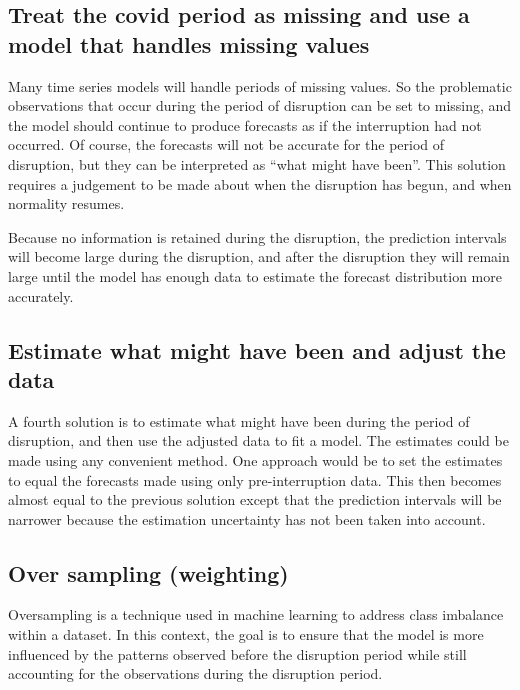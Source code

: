 \documentclass[11pt,a4paper,]{article}
\begin{document}
\subsection{Treat the covid period as missing and use a model that
handles missing
values}\label{treat-the-covid-period-as-missing-and-use-a-model-that-handles-missing-values}

Many time series models will handle periods of missing values. So the
problematic observations that occur during the period of disruption can
be set to missing, and the model should continue to produce forecasts as
if the interruption had not occurred. Of course, the forecasts will not
be accurate for the period of disruption, but they can be interpreted as
``what might have been''. This solution requires a judgement to be made
about when the disruption has begun, and when normality resumes.

Because no information is retained during the disruption, the prediction
intervals will become large during the disruption, and after the
disruption they will remain large until the model has enough data to
estimate the forecast distribution more accurately.

\subsection{Estimate what might have been and adjust the
data}\label{estimate-what-might-have-been-and-adjust-the-data}

A fourth solution is to estimate what might have been during the period
of disruption, and then use the adjusted data to fit a model. The
estimates could be made using any convenient method. One approach would
be to set the estimates to equal the forecasts made using only
pre-interruption data. This then becomes almost equal to the previous
solution except that the prediction intervals will be narrower because
the estimation uncertainty has not been taken into account.

\subsection{Over sampling (weighting)}\label{over-sampling-weighting}

Oversampling is a technique used in machine learning to address class
imbalance within a dataset. In this context, the goal is to ensure that
the model is more influenced by the patterns observed before the
disruption period while still accounting for the observations during the
disruption period.
\end{document}
